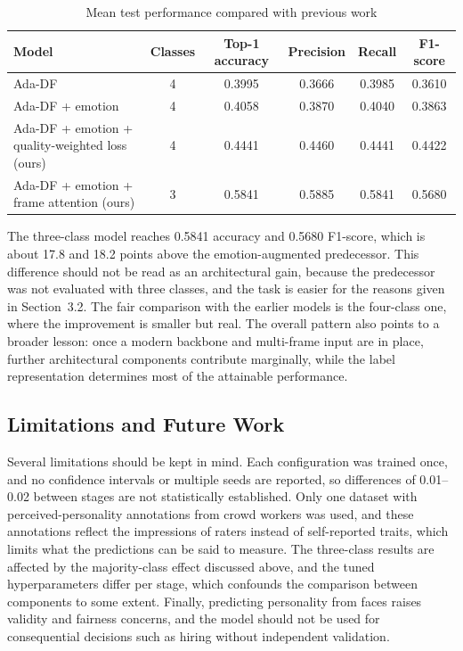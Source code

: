 \documentclass[10pt,a4paper,twocolumn]{article}
\begin{document}
\begin{table}[t]
  \caption{Mean test performance compared with previous work}
  \label{tab:5}
  \centering
  \footnotesize
  \setlength{\tabcolsep}{4pt}
  \begin{tabular}{p{62mm}ccccc}
    \toprule
    Model & Classes & Top-1 accuracy & Precision & Recall & F1-score \\
    \midrule
    Ada-DF~\cite{liu_adadf} & 4 & 0.3995 & 0.3666 & 0.3985 & 0.3610 \\
    Ada-DF + emotion~\cite{wardana} & 4 & 0.4058 & 0.3870 & 0.4040 & 0.3863 \\
    Ada-DF + emotion + quality-weighted loss (ours) & 4 & 0.4441 & 0.4460 & 0.4441 & 0.4422 \\
    Ada-DF + emotion + frame attention (ours) & 3 & 0.5841 & 0.5885 & 0.5841 & 0.5680 \\
    \bottomrule
  \end{tabular}
\end{table}

The three-class model reaches 0.5841 accuracy and 0.5680 F1-score, which is about 17.8 and 18.2 points above the emotion-augmented predecessor. This difference should not be read as an architectural gain, because the predecessor was not evaluated with three classes, and the task is easier for the reasons given in Section~3.2. The fair comparison with the earlier models is the four-class one, where the improvement is smaller but real. The overall pattern also points to a broader lesson: once a modern backbone and multi-frame input are in place, further architectural components contribute marginally, while the label representation determines most of the attainable performance.

\subsection{Limitations and Future Work}
Several limitations should be kept in mind. Each configuration was trained once, and no confidence intervals or multiple seeds are reported, so differences of 0.01--0.02 between stages are not statistically established. Only one dataset with perceived-personality annotations from crowd workers was used, and these annotations reflect the impressions of raters instead of self-reported traits, which limits what the predictions can be said to measure. The three-class results are affected by the majority-class effect discussed above, and the tuned hyperparameters differ per stage, which confounds the comparison between components to some extent. Finally, predicting personality from faces raises validity and fairness concerns, and the model should not be used for consequential decisions such as hiring without independent validation.
\end{document}
